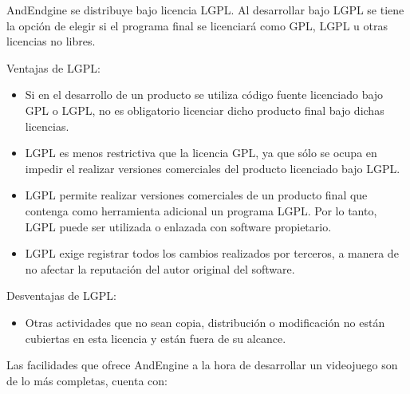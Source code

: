 \documentclass[12 pt, a4paper, twoside]{article}
\begin{document}
AndEndgine se distribuye bajo licencia LGPL. Al desarrollar bajo LGPL se tiene la opción de elegir si el
programa final se licenciará como GPL, LGPL u otras licencias no
libres.

Ventajas de LGPL:
\begin{itemize}
\item Si en el desarrollo de un producto se utiliza código fuente
  licenciado bajo GPL o LGPL, no es obligatorio licenciar dicho
  producto final bajo dichas licencias.
\item LGPL es menos restrictiva que la licencia GPL, ya que sólo se
  ocupa en impedir el realizar versiones comerciales del producto
  licenciado bajo LGPL.
\item LGPL permite realizar versiones comerciales de un
  producto final que contenga como herramienta adicional un programa
  LGPL. Por lo tanto, LGPL puede ser utilizada o enlazada con software
  propietario.
\item LGPL exige registrar todos los cambios realizados por terceros,
  a manera de no afectar la reputación del autor original del
  software.
\end{itemize}

Desventajas de LGPL:
\begin{itemize}
\item Otras actividades que no sean copia, distribución o modificación
  no están cubiertas en esta licencia y están fuera de su alcance.
\end{itemize}

\clearpage
Las facilidades que ofrece AndEngine a la hora de desarrollar un
videojuego son de lo más completas, cuenta con:
\end{document}
